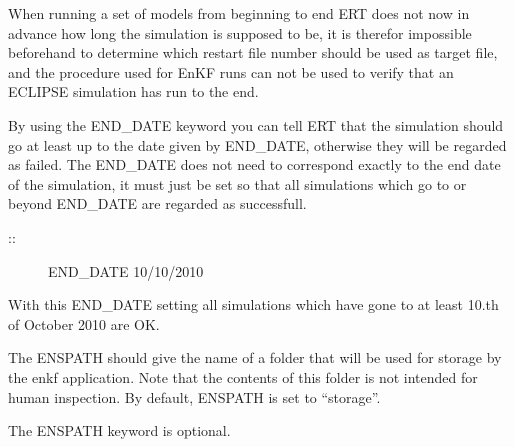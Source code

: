 \documentclass[letterpaper,10pt,english]{sphinxmanual}
\begin{document}
\begin{sphinxShadowBox}

When running a set of models from beginning to end ERT does
not now in advance how long the simulation is supposed to be,
it is therefor impossible beforehand to determine which
restart file number should be used as target file, and the
procedure used for EnKF runs can not be used to verify that an
ECLIPSE simulation has run to the end.

By using the END\_DATE keyword you can tell ERT that the
simulation should go at least up to the date given by
END\_DATE, otherwise they will be regarded as failed. The
END\_DATE does not need to correspond exactly to the end date
of the simulation, it must just be set so that all simulations
which go to or beyond END\_DATE are regarded as successfull.

\begin{description}
\item[{::}] \leavevmode
END\_DATE  10/10/2010

\end{description}

With this END\_DATE setting all simulations which have gone to
at least 10.th of October 2010 are OK.
\end{sphinxShadowBox}
\label{\detokenize{keywords/index:enspath}}
\begin{sphinxShadowBox}

The ENSPATH should give the name of a folder that will be used
for storage by the enkf application. Note that the contents of
this folder is not intended for human inspection. By default,
ENSPATH is set to “storage”.


%
\begin{sphinxVerbatim}[commandchars=\\\{\}]
     
 
\end{sphinxVerbatim}

The ENSPATH keyword is optional.
\end{sphinxShadowBox}
\label{\detokenize{keywords/index:history-source}}
\end{document}
